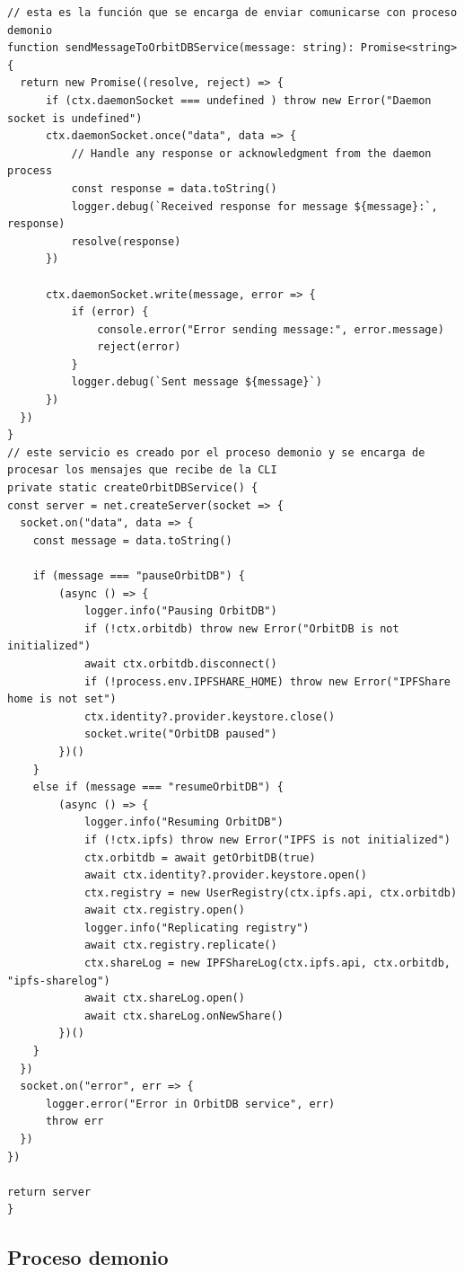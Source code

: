 \begin{verbatim}
// esta es la función que se encarga de enviar comunicarse con proceso demonio
function sendMessageToOrbitDBService(message: string): Promise<string> {
  return new Promise((resolve, reject) => {
      if (ctx.daemonSocket === undefined ) throw new Error("Daemon socket is undefined")
      ctx.daemonSocket.once("data", data => {
          // Handle any response or acknowledgment from the daemon process
          const response = data.toString()
          logger.debug(`Received response for message ${message}:`, response)
          resolve(response)
      })

      ctx.daemonSocket.write(message, error => {
          if (error) {
              console.error("Error sending message:", error.message)
              reject(error)
          }
          logger.debug(`Sent message ${message}`)
      })
  })
}
// este servicio es creado por el proceso demonio y se encarga de procesar los mensajes que recibe de la CLI
private static createOrbitDBService() {
const server = net.createServer(socket => {
  socket.on("data", data => {
    const message = data.toString()

    if (message === "pauseOrbitDB") {
        (async () => {
            logger.info("Pausing OrbitDB")
            if (!ctx.orbitdb) throw new Error("OrbitDB is not initialized")
            await ctx.orbitdb.disconnect()
            if (!process.env.IPFSHARE_HOME) throw new Error("IPFShare home is not set")
            ctx.identity?.provider.keystore.close()
            socket.write("OrbitDB paused")
        })()
    }
    else if (message === "resumeOrbitDB") {
        (async () => {
            logger.info("Resuming OrbitDB")
            if (!ctx.ipfs) throw new Error("IPFS is not initialized")
            ctx.orbitdb = await getOrbitDB(true)
            await ctx.identity?.provider.keystore.open()
            ctx.registry = new UserRegistry(ctx.ipfs.api, ctx.orbitdb)
            await ctx.registry.open()
            logger.info("Replicating registry")
            await ctx.registry.replicate()
            ctx.shareLog = new IPFShareLog(ctx.ipfs.api, ctx.orbitdb, "ipfs-sharelog")
            await ctx.shareLog.open()
            await ctx.shareLog.onNewShare()
        })()
    }
  })
  socket.on("error", err => {
      logger.error("Error in OrbitDB service", err)
      throw err
  })
})

return server
}
\end{verbatim}

\subsection{Proceso demonio}


